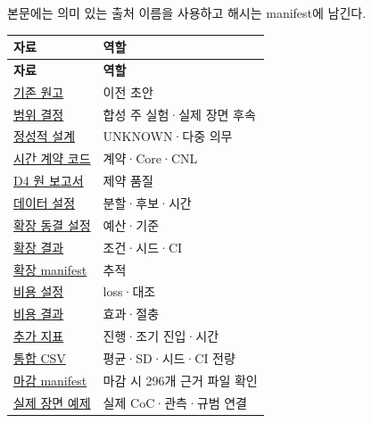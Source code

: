\documentclass[11pt,a4paper]{article}
\begin{document}
본문에는 의미 있는 출처 이름을 사용하고 해시는 manifest에 남긴다.\par

\begingroup\small
\begin{longtable}{@{}>{\raggedright\arraybackslash}p{}>{\raggedright\arraybackslash}p{}@{}}
\toprule
\textbf{자료} & \textbf{역할} \\
\midrule\endfirsthead
\toprule
\textbf{자료} & \textbf{역할} \\
\midrule\endhead
\bottomrule\endfoot
\href{\detokenize{../../../../../../projects/04-guardsynth-coc/paper/ieee-access/main.tex}}{기존 원고} & 이전 초안 \\
\href{\detokenize{../../../../../../projects/04-guardsynth-coc/docs/decisions/PAPER1_METHOD_PRESERVATION_AND_LABELING_DECISION_V01.md}}{범위 결정} & 합성 주 실험·실제 장면 후속 \\
\href{\detokenize{../../../../../../projects/04-guardsynth-coc/docs/designs/PAPER1_ACTION_CONTRACT_DESIGN_V01.md}}{정성적 설계} & UNKNOWN·다중 의무 \\
\href{\detokenize{../../../../../../projects/04-guardsynth-coc/experiments/paper1_cnl_learning/temporal_preservation.py}}{시간 계약 코드} & 계약·Core·CNL \\
\href{\detokenize{../../paper1-temporal-diversity-001/diversity-analysis-2026-09-29-001/REPORT_KO.md}}{D4 원 보고서} & 제약 품질 \\
\href{\detokenize{../temporal-training-data-2026-09-29-001/protocol.json}}{데이터 설정} & 분할·후보·시간 \\
\href{\detokenize{../temporal-expansion-protocol-2026-09-29-001/protocol.json}}{확장 동결 설정} & 예산·기준 \\
\href{\detokenize{../temporal-expansion-learning-2026-09-29-001/RESULT.json}}{확장 결과} & 조건·시드·CI \\
\href{\detokenize{../temporal-expansion-learning-2026-09-29-001/RUN_MANIFEST.json}}{확장 manifest} & 추적 \\
\href{\detokenize{../temporal-cost-protocol-2026-09-29-001/protocol.json}}{비용 설정} & loss·대조 \\
\href{\detokenize{../temporal-cost-learning-2026-09-29-001/REPORT_KO.md}}{비용 결과} & 효과·절충 \\
\href{\detokenize{../temporal-secondary-metrics-2026-09-29-001/REPORT_KO.md}}{추가 지표} & 진행·조기 진입·시간 \\
\href{\detokenize{../temporal-experiment-closure-2026-09-29-001/all_primary_metrics.csv}}{통합 CSV} & 평균·SD·시드·CI 전량 \\
\href{\detokenize{../temporal-experiment-closure-2026-09-29-001/RUN_MANIFEST.json}}{마감 manifest} & 마감 시 296개 근거 파일 확인 \\
\href{\detokenize{../../../../../../projects/04-guardsynth-coc/paper/examples/SCENE18_PIPELINE_EXAMPLE_REPORT_V01.md}}{실제 장면 예제} & 실제 CoC·관측·규범 연결 \\
\end{longtable}
\endgroup
\end{document}
